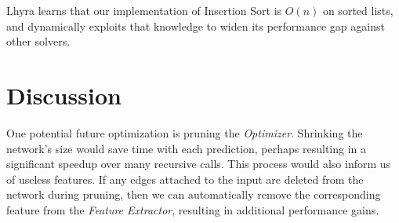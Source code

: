 \documentclass[11pt]{article}
\begin{document}
\begin{figure}[!ht]
    \centering
    \begin{floatrow}
      
    \end{floatrow}
\end{figure}

Lhyra learns that our implementation of Insertion Sort is $O(n)$ on sorted lists, and dynamically exploits that knowledge to widen its performance gap against other solvers.

\section{Discussion}

One potential future optimization is pruning the \textit{Optimizer}. Shrinking the network's size would save time with each prediction, perhaps resulting in a significant speedup over many recursive calls. This process would also inform us of useless features. If any edges attached to the input are deleted from the network during pruning, then we can automatically remove the corresponding feature from the \textit{Feature Extractor}, resulting in additional performance gains.
\end{document}
